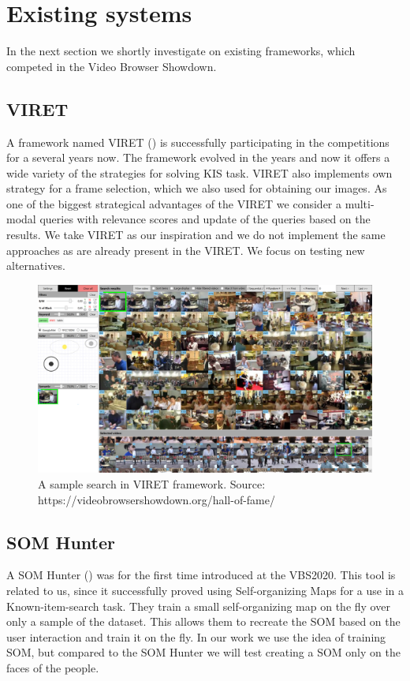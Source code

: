\section{Existing systems}

In the next section we shortly investigate on existing frameworks, which competed in the Video Browser Showdown.

\subsection{VIRET}

A framework named VIRET (\cite{lokovc2019framework, lokovc2019viret}) is successfully participating in the competitions for a several years now. The framework evolved in the years and now it offers a wide variety of the strategies for solving KIS task. VIRET also implements own strategy for a frame selection, which we also used for obtaining our images. As one of the biggest strategical advantages of the VIRET we consider a multi-modal queries with relevance scores and update of the queries based on the results. We take VIRET as our inspiration and we do not implement the same approaches as are already present in the VIRET. We focus on testing new alternatives.

\begin{figure}
    \centering
    \includegraphics{img/viret_small.png}
    \caption{A sample search in VIRET framework. Source: https://videobrowsershowdown.org/hall-of-fame/}
    \label{fig:viret}
\end{figure}

\subsection{SOM Hunter}

A SOM Hunter (\cite{kratochvil2020som}) was for the first time introduced at the VBS2020. This tool is related to us, since it successfully proved using Self-organizing Maps for a use in a Known-item-search task. They train a small self-organizing map on the fly over only a sample of the dataset. This allows them to recreate the SOM based on the user interaction and train it on the fly. In our work we use the idea of training SOM, but compared to the SOM Hunter we will test creating a SOM only on the faces of the people.


